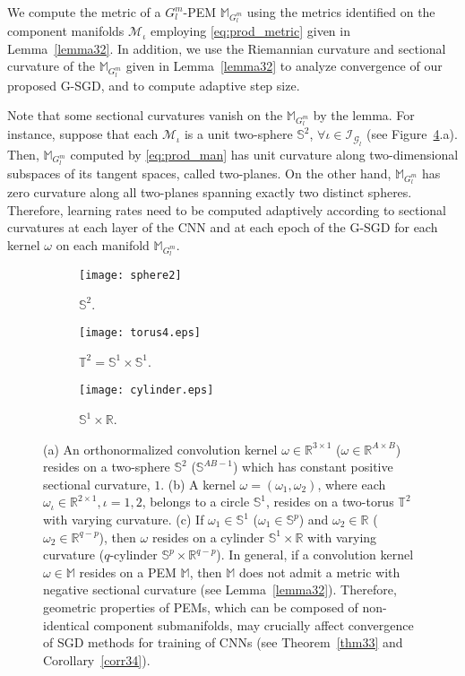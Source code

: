 \documentclass[10pt,journal,compsoc]{IEEEtran}
\theoremstyle{definition}
\theoremstyle{definition}
\theoremstyle{remark}
\theoremstyle{remark}
\theoremstyle{remark}
\begin{document}
We compute the metric of a $G^m_l$-PEM $\mathbb{M}_{G^m_l}$ using the metrics identified on the component manifolds $\mathcal{M}_{\iota}$ employing \eqref{eq:prod_metric} given in Lemma~\ref{lemma32}. In addition, we use the Riemannian curvature and sectional curvature of the $\mathbb{M}_{G^m_l}$ given in Lemma~\ref{lemma32} to analyze convergence of our proposed G-SGD, and to compute adaptive step size. 

Note that some sectional curvatures vanish on the $\mathbb{M}_{G^m_l}$ by the lemma. For instance, suppose that each $\mathcal{M}_{\iota}$ is a unit two-sphere $\mathbb{S}^2$, $\forall \iota \in \mathcal{I}_{\mathcal{G}_l}$ (see Figure~\ref{fig1}.a). Then, $\mathbb{M}_{G^m_l}$ computed by \eqref{eq:prod_man} has unit curvature along two-dimensional subspaces of its tangent spaces, called two-planes. On the other hand, $\mathbb{M}_{G^m_l}$ has  zero curvature along all two-planes spanning exactly two distinct spheres. Therefore, learning rates need to be computed adaptively according to sectional curvatures at each layer of the CNN and at each epoch of the G-SGD for each kernel $\omega$ on each manifold $\mathbb{M}_{G^m_l}$. %


\begin{figure}[t!]
	\centering
	\begin{subfigure}[b]{0.15\textwidth}		
		\label{fig:sphere}%
		\texttt{[image: sphere2]}%
		\caption{$\mathbb{S}^2$.}
	\end{subfigure}
	\begin{subfigure}[b]{0.15\textwidth}		
		\label{fig:torus}%
		\texttt{[image: torus4.eps]}%
		\caption{$\mathbb{T}^2 = \mathbb{S}^1 \times \mathbb{S}^1$.}
	\end{subfigure}
	\begin{subfigure}[b]{0.15\textwidth}
		\label{fig:cylinder}%
		\texttt{[image: cylinder.eps]}%
		\caption{$\mathbb{S}^1 \times \mathbb{R}$.}
	\end{subfigure}
	\caption{(a) An orthonormalized convolution kernel ${\omega \in \mathbb{R}^{3 \times 1} }$ (${\omega \in \mathbb{R}^{A \times B}}$) resides on a two-sphere $\mathbb{S}^2$ ($\mathbb{S}^{AB-1}$) which has constant positive sectional curvature, $1$. (b) A kernel $\omega = (\omega_1, \omega_2)$, where each $\omega_{\iota} \in \mathbb{R}^{2 \times 1}, \iota = 1,2$, belongs to a circle $\mathbb{S}^1$, resides on a two-torus $\mathbb{T}^2$ with varying curvature. (c) If $\omega_{1} \in \mathbb{S}^{1}$ ($\omega_{1} \in \mathbb{S}^{p}$) and $\omega_{2} \in \mathbb{R}$ ($\omega_{2} \in \mathbb{R}^{q-p}$), then $\omega$ resides on a cylinder $\mathbb{S}^1 \times \mathbb{R}$ with varying curvature ($q$-cylinder $\mathbb{S}^p \times \mathbb{R}^{q-p}$). In general, if a convolution kernel $\omega \in \mathbb{M}$ resides on a PEM $\mathbb{M}$, then $\mathbb{M}$ does not admit a metric with negative sectional curvature (see Lemma~\ref{lemma32}). Therefore, geometric properties of PEMs, which can be composed of non-identical component submanifolds, may crucially affect convergence of SGD methods for training of CNNs  (see Theorem~\ref{thm33} and Corollary~\ref{corr34}). }
	\label{fig1}
\end{figure}
\end{document}
